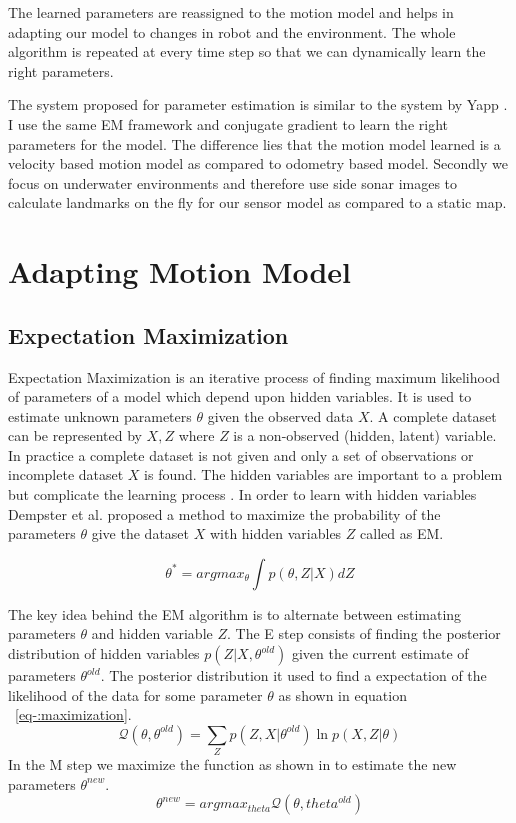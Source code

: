 \documentclass[12pt]{dalcsthesis}
\begin{document}
The learned parameters are reassigned to the motion model and helps in adapting our model to changes in robot and the environment. The whole algorithm is repeated at every time step so that we can dynamically learn the right parameters.

The system proposed for parameter estimation is similar to the system by Yapp \cite{Yap2008}. I use the same EM framework and conjugate gradient to learn the right parameters for the model. The difference lies that the motion model learned is a velocity based motion model as compared to odometry based model. Secondly we focus on underwater environments and therefore use side sonar images to calculate landmarks on the fly for our sensor model as compared to a static map.

\section{Adapting Motion Model}
\label{adapting the motion model}
\subsection{Expectation Maximization}

Expectation Maximization is an iterative process of finding maximum likelihood of parameters of a model which depend upon hidden variables. It is used to estimate unknown parameters $\theta$ given the observed data $X$. A complete dataset can be represented by ${X,Z}$ where $Z$ is a non-observed (hidden, latent) variable. In practice a complete dataset is not given and only a set of observations or incomplete dataset $X$ is found. The hidden variables are important to a problem but complicate the learning process \cite{russell2003artificial}. In order to learn with hidden variables Dempster et al. \cite{dempster1977maximum} proposed a method to maximize the probability of the parameters $\theta$ give the dataset $X$ with hidden variables $Z$ called as EM.

\begin{equation}
\label{eq-:em_description}
\theta^{*}=arg max_{\theta} \int p(\theta,Z|X)dZ
\end{equation}

The key idea behind the EM algorithm is to alternate between estimating parameters $\theta$ and hidden variable $Z$.
The E step consists of finding the posterior distribution of hidden variables $p(Z|X,\theta^{old})$ given the current estimate of parameters $\theta^{old}$. The posterior distribution it used to find a expectation of the likelihood of the data for some parameter $\theta$ as shown in equation ~\ref{eq-:maximization}. 
\begin{equation}
\label{eq-:maximization}
\mathcal{Q}(\theta,\theta^{old})=\sum_{Z}p(Z,X|\theta^{old}) \ln p(X,Z|\theta)
\end{equation}
In the M step we maximize the function as shown in  to estimate the new parameters $\theta^{new}$.
\begin{equation}
\theta^{new}=arg max_{theta} \mathcal{Q}(\theta,theta^{old})
\end{equation}
\end{document}
